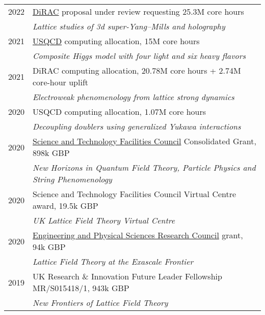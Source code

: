 \documentclass[10 pt]{article}
\begin{document}
\vspace{-12 pt} %
\begin{tabular}[t]{cl}
  2022 & \href{https://dirac.ac.uk}{DiRAC} proposal under review requesting 25.3M core hours                  \\ %
       & \textit{Lattice studies of 3d super-Yang--Mills and holography}                                      \\[6 pt]
  2021 & \href{http://www.usqcd.org}{USQCD} computing allocation, 15M core hours                              \\ %
       & \textit{Composite Higgs model with four light and six heavy flavors}                                 \\[6 pt]
  2021 & DiRAC computing allocation, 20.78M core hours + 2.74M core-hour uplift                               \\ %
       & \textit{Electroweak phenomenology from lattice strong dynamics}                                      \\[6 pt]
  2020 & USQCD computing allocation, 1.07M core hours                                                         \\ %
       & \textit{Decoupling doublers using generalized Yukawa interactions}                                   \\[6 pt]
  2020 & \href{https://stfc.ukri.org}{Science and Technology Facilities Council} Consolidated Grant, 898k GBP \\
       & \textit{New Horizons in Quantum Field Theory, Particle Physics and String Phenomenology}             \\[6 pt]
  2020 & Science and Technology Facilities Council Virtual Centre award, 19.5k GBP                            \\
       & \textit{UK Lattice Field Theory Virtual Centre}                                                      \\[6 pt]
  2020 & \href{https://epsrc.ukri.org}{Engineering and Physical Sciences Research Council} grant, 94k GBP     \\
       & \textit{Lattice Field Theory at the Exascale Frontier}                                               \\[6 pt]
  2019 & UK Research \& Innovation Future Leader Fellowship {MR/S015418/1}, 943k GBP                          \\
       & \textit{New Frontiers of Lattice Field Theory}                                                       \\[6 pt]
\end{tabular}
\end{document}
